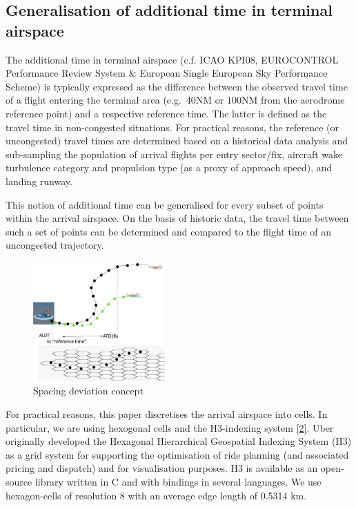\documentclass[letterpaper, 10 pt, journal, twoside]{IEEEtran}
\begin{document}
\hypertarget{generalisation-of-additional-time-in-terminal-airspace}{%
\subsection{Generalisation of additional time in terminal
airspace}\label{generalisation-of-additional-time-in-terminal-airspace}}

The additional time in terminal airspace (c.f. ICAO KPI08, EUROCONTROL
Performance Review System \& European Single European Sky Performance
Scheme) is typically expressed as the difference between the observed
travel time of a flight entering the terminal area (e.g.~40NM or 100NM
from the aerodrome reference point) and a respective reference time. The
latter is defined as the travel time in non-congested situations. For
practical reasons, the reference (or uncongested) travel times are
determined based on a historical data analysis and sub-sampling the
population of arrival flights per entry sector/fix, aircraft wake
turbulence category and propulsion type (as a proxy of approach speed),
and landing runway.

This notion of additional time can be generalised for every subset of
points within the arrival airspace. On the basis of historic data, the
travel time between such a set of points can be determined and compared
to the flight time of an uncongested trajectory.

\begin{figure}

{\centering \includegraphics[width=0.45\textwidth,height=\textheight]{./figures/concept.png}

}

\caption{\label{fig-spacing-deviation-concept}Spacing deviation concept}

\end{figure}

For practical reasons, this paper discretises the arrival airspace into
cells. In particular, we are using hexogonal cells and the H3-indexing
system \protect\hyperlink{ref-ubertechnologiesinc2018}{{[}2{]}}. Uber
originally developed the Hexagonal Hierarchical Geospatial Indexing
System (H3) as a grid system for supporting the optimisation of ride
planning (and associated pricing and dispatch) and for visualisation
purposes. H3 is available as an open-source library written in C and
with bindings in several languages. We use hexagon-cells of resolution 8
with an average edge length of 0.5314 km.
\end{document}
